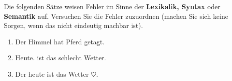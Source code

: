 Die folgenden Sätze weisen Fehler im Sinne der \textbf{Lexikalik, Syntax} oder \textbf{Semantik} auf. Versuchen Sie die Fehler zuzuordnen
(machen Sie sich keine Sorgen, wenn das nicht eindeutig machbar ist).
\begin{enumerate}
	\item Der Himmel hat Pferd getagt.
	\item Heute. ist das schlecht Wetter.
	\item Der heute ist das Wetter $\heartsuit$.
\end{enumerate}